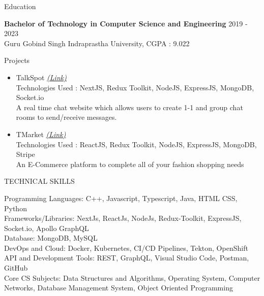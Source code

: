 \documentclass{resume} %
\begin{document}
\begin{rSection}{Education}

{\bf Bachelor of Technology in Computer Science and Engineering} \hfill {2019 - 2023}
\\ 
{\normalfont Guru Gobind Singh Indraprastha University}, {\normalfont CGPA : 9.022} 
\\

\end{rSection}
 


\begin{rSection}{Projects}
   \begin{itemize}

    \item TalkSpot
   \href{https://github.com/tushargahlaut/talkspot-chat-app}{\emph{(Link)}} 
   \\Technologies Used : NextJS, Redux Toolkit, NodeJS, ExpressJS, MongoDB, Socket.io 
   \\{\normalfont A real time chat website which allows users to create 1-1 and group chat rooms to send/receive messages.}
   
   \item TMarket
   \href{https://github.com/tushargahlaut/TMarket}{\emph{(Link)}}
   \\Technologies Used : ReactJS, Redux Toolkit, NodeJS, ExpressJS, MongoDB, Stripe
   \\{\normalfont An E-Commerce platform to complete all of your fashion shopping needs}
   
   \end{itemize}
\end{rSection}

\begin{rSection}{TECHNICAL SKILLS}




Programming Languages: {\normalfont C++, Javascript, Typescript, Java, HTML CSS, Python}
\\
Frameworks/Libraries: {\normalfont NextJs, ReactJs, NodeJs, Redux-Toolkit, ExpressJS,  Socket.io, Apollo GraphQL}
 \\
 Database: {\normalfont MongoDB, MySQL}
 \\
 DevOps and Cloud: {\normalfont Docker, Kubernetes, CI/CD Pipelines, Tekton, OpenShift}
 \\
 API and Development Tools: {\normalfont REST, GraphQL, Visual Studio Code, Postman, GitHub}
 \\
 Core CS Subjects: {\normalfont Data Structures and Algorithms, Operating System, Computer Networks, Database Management System, Object Oriented Programming}

\end{rSection}
\end{document}
